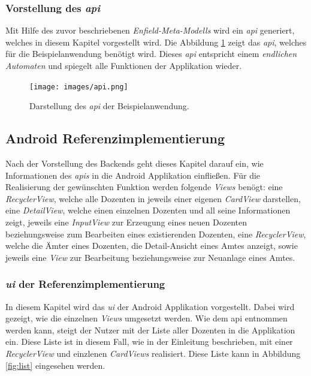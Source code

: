 \subsubsection{Vorstellung des \textit{\acf{api}}}
Mit Hilfe des zuvor beschriebenen \textit{Enfield-Meta-Modells} wird ein \textit{\acl{api}} generiert, welches in diesem Kapitel vorgestellt wird.
Die Abbildung \ref{fig:api} zeigt das \textit{\acl{api}}, welches für die Beispielanwendung benötigt wird. Dieses\textit{ \ac{api}} entspricht einem \textit{endlichen Automaten} und spiegelt alle Funktionen der Applikation wieder.  

\begin{figure}[H]
	\begin{center}
		\texttt{[image: images/api.png]}
		\caption{Darstellung des \textit{\ac{api}} der Beispielanwendung.}
		\label{fig:api}
	\end{center}
\end{figure}

\subsection{Android Referenzimplementierung}\label{sec:ref_impl}
Nach der Vorstellung des Backends geht dieses Kapitel darauf ein, wie Informationen des \textit{\acl{api}s} in die Android Applikation einfließen.
Für die Realisierung der gewünschten Funktion werden folgende \textit{Views} benögt: eine \textit{RecyclerView}, welche alle Dozenten in jeweils einer eigenen \textit{CardView} darstellen, eine \textit{DetailView}, welche einen einzelnen Dozenten und all seine Informationen zeigt, jeweils eine \textit{InputView} zur Erzeugung eines neuen Dozenten beziehungsweise zum Bearbeiten eines existierenden Dozenten, eine \textit{RecyclerView}, welche die Ämter eines Dozenten, die Detail-Ansicht eines Amtes anzeigt, sowie jeweils eine \textit{View} zur Bearbeitung beziehungsweise zur Neuanlage eines Amtes.

\subsubsection{\textit{\acf{ui}} der Referenzimplementierung}
In diesem Kapitel wird das \textit{\acl{ui}} der Android Applikation vorgestellt. Dabei wird gezeigt, wie die einzelnen \textit{Views} umgesetzt werden.
Wie dem \acl{api} entnommen werden kann, steigt der Nutzer mit der Liste aller Dozenten in die Applikation ein. Diese Liste ist in diesem Fall, wie in der Einleitung beschrieben, mit einer \textit{RecyclerView} und einzlenen \textit{CardViews} realisiert. Diese Liste kann in Abbildung \ref{fig:list} eingesehen werden.

